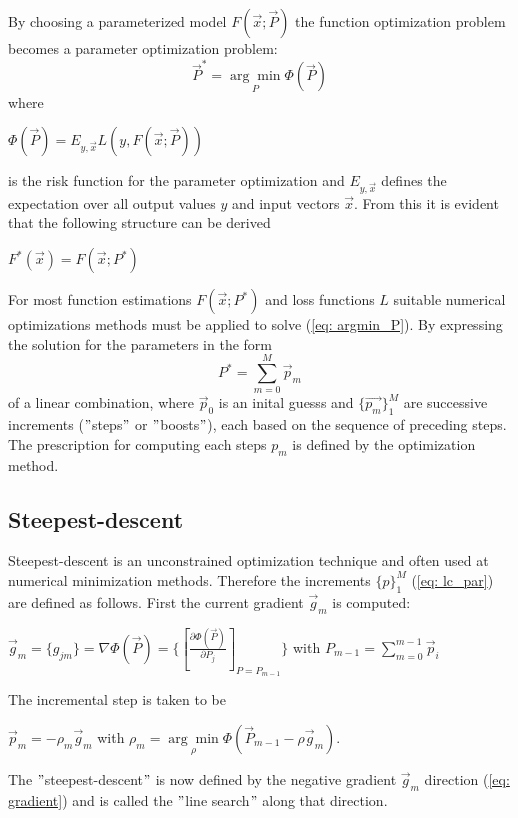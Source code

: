 \documentclass[12pt, a4paper]{article}
\begin{document}
By choosing a parameterized model $F(\vec{x};\vec{P})$ the function optimization problem becomes a parameter optimization problem:
\begin{equation}
    \label{eq: argmin_P}
    \vec{P}^{\ast} = \underset{P}{\arg\min} \Phi(\vec{P})
\end{equation}
where
\begin{center}
    $\Phi(\vec{P}) = E_{y,\vec{x}} L(y,F(\vec{x};\vec{P})) $
\end{center}
is the risk function for the parameter optimization and $E_{y,\vec{x}}$ defines the expectation over all output values $y$ and input vectors $\vec{x}$. From this it is evident that the following structure can be derived
\begin{center}
    $F^{\ast}(\vec{x}) = F(\vec{x};P^{\ast})$
\end{center}
For most function estimations $F(\vec{x};P^{\ast})$ and loss functions $L$ suitable numerical optimizations methods must be applied to solve (\ref{eq: argmin_P}). By expressing the solution for the parameters in the form 
\begin{equation}
    \label{eq: lc_par}
    P^{\ast} = \sum_{m=0}^{M} \vec{p}_m
\end{equation}
of a linear combination, where $\vec{p}_0$ is an inital guesss and $\{\vec{p_m}\}_1^M$ are successive increments ($"$steps$"$ or $"$boosts$"$), each based on the sequence of preceding steps. The prescription for computing each steps $p_m$ is defined by the optimization method.
\subsection{Steepest-descent}

Steepest-descent is an unconstrained optimization technique and often used at numerical minimization methods. Therefore the increments $\{p\}_1^M$ (\ref{eq: lc_par}) are defined as follows. First the current gradient $\vec{g}_m$ is computed:
\begin{center}
    $\vec{g}_m = \{g_{jm}\} = \nabla \Phi(\vec{P}) = \{ [\frac{\partial \Phi(\vec{P})}{\partial P_j}]_{P=P_{m-1}} \}$ with $P_{m-1} = \sum_{m=0}^{m-1} \vec{p}_i$
\end{center}
The incremental step is taken to be
\begin{center}
    \label{eq: gradient}
    $\vec{p}_m = - \rho_m \vec{g}_m$ with $\rho_m = \underset{\rho}{\arg\min} \Phi(\vec{P}_{m-1} - \rho \vec{g}_m)$.
\end{center}
The $"$steepest-descent$"$ is now defined by the negative gradient \text{-}$\vec{g}_m$ direction (\ref{eq: gradient}) and is called the $"$line search$"$ along that direction.
\end{document}
